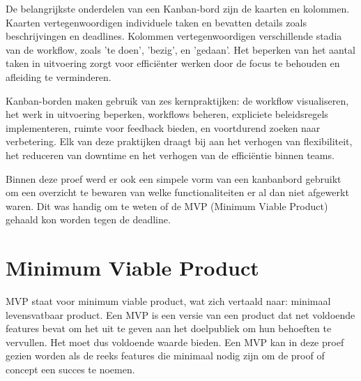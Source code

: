 De belangrijkste onderdelen van een Kanban-bord zijn de kaarten en kolommen. Kaarten vertegenwoordigen individuele taken en bevatten details zoals beschrijvingen en deadlines. Kolommen vertegenwoordigen verschillende stadia van de workflow, zoals 'te doen', 'bezig', en 'gedaan'. Het beperken van het aantal taken in uitvoering zorgt voor efficiënter werken door de focus te behouden en afleiding te verminderen.

Kanban-borden maken gebruik van zes kernpraktijken: de workflow visualiseren, het werk in uitvoering beperken, workflows beheren, expliciete beleidsregels implementeren, ruimte voor feedback bieden, en voortdurend zoeken naar verbetering. Elk van deze praktijken draagt bij aan het verhogen van flexibiliteit, het reduceren van downtime en het verhogen van de efficiëntie binnen teams.\autocite{Hennigan2024}

Binnen deze proef werd er ook een simpele vorm van een kanbanbord gebruikt om een overzicht te bewaren van welke functionaliteiten er al dan niet afgewerkt waren. Dit was handig om te weten of de MVP (Minimum Viable Product) gehaald kon worden tegen de deadline.

\section{Minimum Viable Product}
MVP staat voor minimum viable product, wat zich vertaald naar: minimaal levensvatbaar product. Een MVP is een versie van een product dat net voldoende features bevat om het uit te geven aan het doelpubliek om hun behoeften te vervullen. Het moet dus voldoende waarde bieden. \autocite{VanTellingen2022}
Een MVP kan in deze proef gezien worden als de reeks features die minimaal nodig zijn om de proof of concept een succes te noemen.